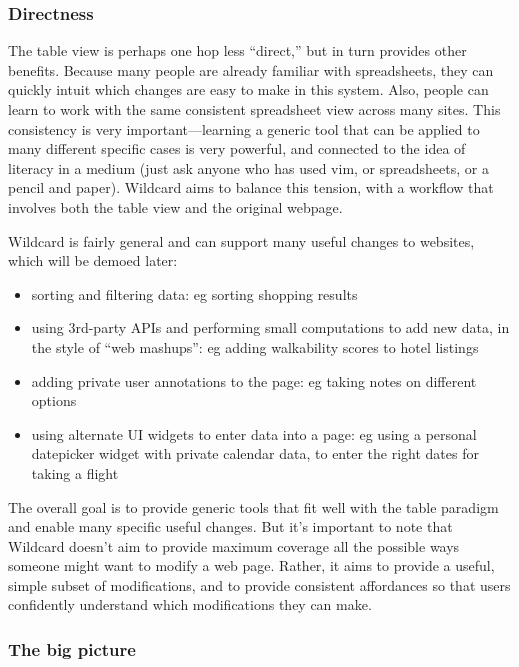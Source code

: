 \documentclass[english,submission]{programming}
\providecommand{\tightlist}{%
  \setlength{\itemsep}{0pt}\setlength{\parskip}{0pt}}
\begin{document}
\hypertarget{directness}{%
\subsubsection{Directness}\label{directness}}

The table view is perhaps one hop less ``direct,'' but in turn provides
other benefits. Because many people are already familiar with
spreadsheets, they can quickly intuit which changes are easy to make in
this system. Also, people can learn to work with the same consistent
spreadsheet view across many sites. This consistency is very
important---learning a generic tool that can be applied to many
different specific cases is very powerful, and connected to the idea of
literacy in a medium (just ask anyone who has used vim, or spreadsheets,
or a pencil and paper). Wildcard aims to balance this tension, with a
workflow that involves both the table view and the original webpage.

Wildcard is fairly general and can support many useful changes to
websites, which will be demoed later:

\begin{itemize}
\tightlist
\item
  sorting and filtering data: eg sorting shopping results
\item
  using 3rd-party APIs and performing small computations to add new
  data, in the style of ``web mashups'': eg adding walkability scores to
  hotel listings
\item
  adding private user annotations to the page: eg taking notes on
  different options
\item
  using alternate UI widgets to enter data into a page: eg using a
  personal datepicker widget with private calendar data, to enter the
  right dates for taking a flight
\end{itemize}

The overall goal is to provide generic tools that fit well with the
table paradigm and enable many specific useful changes. But it's
important to note that Wildcard doesn't aim to provide maximum coverage
all the possible ways someone might want to modify a web page. Rather,
it aims to provide a useful, simple subset of modifications, and to
provide consistent affordances so that users confidently understand
which modifications they can make.

\hypertarget{the-big-picture}{%
\subsubsection{The big picture}\label{the-big-picture}}
\end{document}
